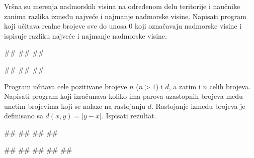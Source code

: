 \begin{Exercise}[label=1.3_25] 
Vršna su merenja nadmorskih visina na određenom delu teritorije i
naučnike zanima razlika između najveće i najmanje nadmorske
visine. Napisati program koji učitava realne brojeve sve do unosa $0$
koji označavaju nadmorske visine i ispisuje razliku najveće i najmanje
nadmorske visine.

\begin{miditest}
\begin{upotreba}{1}
#\naslovInt#
##
##
\end{upotreba}
\end{miditest}
\begin{miditest}
\begin{upotreba}{2}
#\naslovInt#
##
##
\end{upotreba}
\end{miditest}
\end{Exercise}
\begin{Answer}[ref=1.3_25]
\end{Answer}



\begin{Exercise}[label=1.3_26] 
Program učitava cele pozitivane brojeve $n$ ($n>1$) i $d$, a zatim i
$n$ celih brojeva. Napisati program koji izračunava koliko ima parova
uzastopnih brojeva među unetim brojevima koji se nalaze na rastojanju
$d$. Rastojanje između brojeva je definisano sa
$d(x,y)=|y-x|$. Ispisati rezultat.

\begin{miditest}
\begin{upotreba}{1}
#\naslovInt#
##
##
##
\end{upotreba}
\end{miditest}
\begin{miditest}
\begin{upotreba}{2}
#\naslovInt#
##
##
##
##
\end{upotreba}
\end{miditest}
\end{Exercise}
\begin{Answer}[ref=1.3_26]
\end{Answer}



